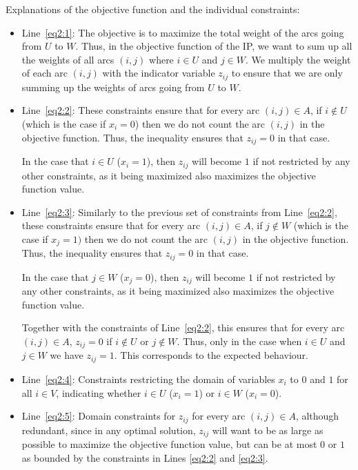 \documentclass{article}
\begin{document}
Explanations of the objective function and the individual constraints:
\begin{itemize}
    \item Line~\ref{eq2:1}: The objective is to maximize the total weight of the arcs going from $U$ to $W$. Thus, in the objective function of the IP, we want to sum up all the weights of all arcs $(i,j)$ where $i \in U$ and $j \in W$. We multiply the weight of each arc $(i,j)$ with the indicator variable $z_{ij}$ to ensure that we are only summing up the weights of arcs going from $U$ to $W$.
    
    \item Line~\ref{eq2:2}: These constraints ensure that for every arc $(i,j) \in A$, if $i \not \in U$ (which is the case if $x_i = 0$) then we do not count the arc $(i,j)$ in the objective function. Thus, the inequality ensures that $z_{ij} = 0$ in that case. 
    
    In the case that $i \in U$ ($x_i = 1$), then $z_{ij}$ will become $1$ if not restricted by any other constraints, as it being maximized also maximizes the objective function value.
    
    \item Line~\ref{eq2:3}: Similarly to the previous set of constraints from Line~\ref{eq2:2}, these constraints ensure that for every arc $(i,j) \in A$, if $j \not\in W$ (which is the case if $x_j = 1)$ then we do not count the arc $(i,j)$ in the objective function. Thus, the inequality ensures that $z_{ij} = 0$ in that case. 

    In the case that $j \in W$ ($x_j = 0$), then $z_{ij}$ will become $1$ if not restricted by any other constraints, as it being maximized also maximizes the objective function value.

    Together with the constraints of Line~\ref{eq2:2}, this ensures that for every arc $(i,j) \in A$, $z_{ij} = 0$ if $i \not\in U$ or $j \not\in W$. Thus, only in the case when $i \in U$ and $j \in W$ we have $z_{ij} = 1$. This corresponds to the expected behaviour.

    \item Line~\ref{eq2:4}: Constraints restricting the domain of variables $x_i$ to $0$ and $1$ for all $i \in V$, indicating whether $i \in U$ ($x_i = 1$) or $i \in W$ ($x_i = 0$).

    \item Line~\ref{eq2:5}: Domain constraints for $z_{ij}$ for every arc $(i,j) \in A$, although redundant, since in any optimal solution, $z_{ij}$ will want to be as large as possible to maximize the objective function value, but can be at most $0$ or $1$ as bounded by the constraints in Lines \ref{eq2:2} and \ref{eq2:3}.
\end{itemize}
\end{document}
